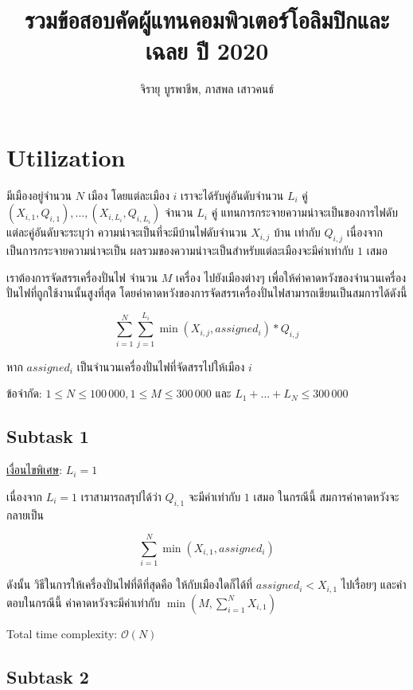 \documentclass[12pt]{article}
\title{รวมข้อสอบคัดผู้แทนคอมพิวเตอร์โอลิมปิกและเฉลย ปี 2020}
\author{จิรายุ บูรพาชีพ, ภาสพล เสาวคนธ์}
\date{}
\begin{document}
\maketitle

\section{Utilization}

มีเมืองอยู่จำนวน $N$ เมือง โดยแต่ละเมือง $i$ เราจะได้รับคู่อันดับจำนวน $L_i$ คู่ $(X_{i,1}, Q_{i,1}), ..., (X_{i,L_i}, Q_{i,L_i})$ จำนวน $L_i$ คู่ แทนการกระจายความน่าจะเป็นของการไฟดับ แต่ละคู่อันดับจะระบุว่า ความน่าจะเป็นที่จะมีบ้านไฟดับจำนวน $X_{i,j}$ บ้าน เท่ากับ $Q_{i,j}$  เนื่องจากเป็นการกระจายความน่าจะเป็น ผลรวมของความน่าจะเป็นสำหรับแต่ละเมืองจะมีค่าเท่ากับ $1$ เสมอ

เราต้องการจัดสรรเครื่องปั่นไฟ จำนวน $M$ เครื่อง ไปยังเมืองต่างๆ เพื่อให้ค่าคาดหวังของจำนวนเครื่องปั่นไฟที่ถูกใช้งานนั้นสูงที่สุด โดยค่าคาดหวังของการจัดสรรเครื่องปั่นไฟสามารถเขียนเป็นสมการได้ดังนี้

$$
\sum_{i=1}^{N}\sum_{j=1}^{L_i}\min(X_{i,j},assigned_i) * Q_{i,j}
$$

หาก $assigned_i$ เป็นจำนวนเครื่องปั่นไฟที่จัดสรรไปให้เมือง $i$

ข้อจำกัด: $1 \leq N \leq 100\,000, 1 \leq M \leq 300\,000$ และ $L_1 + ... + L_N \leq 300\,000$

\subsection{Subtask 1}

\underline{เงื่อนไขพิเศษ}: $L_i = 1$

เนื่องจาก $L_i=1$ เราสามารถสรุปได้ว่า $Q_{i,1}$ จะมีค่าเท่ากับ $1$ เสมอ ในกรณีนี้ สมการค่าคาดหวังจะกลายเป็น

$$
\sum_{i=1}^{N}\min(X_{i,1},assigned_i)
$$

\setlength{\fboxsep}{1em}

ดังนั้น วิธีในการให้เครื่องปั่นไฟที่ดีที่สุดคือ ให้กับเมืองใดก็ได้ที่ $assigned_i < X_{i,1}$ ไปเรื่อยๆ และคำตอบในกรณีนี้ ค่าคาดหวังจะมีค่าเท่ากับ $\min({M, \sum_{i=1}^{N}X_{i,1}})$

Total time complexity: $\mathcal{O}(N)$

\subsection{Subtask 2}
\end{document}
